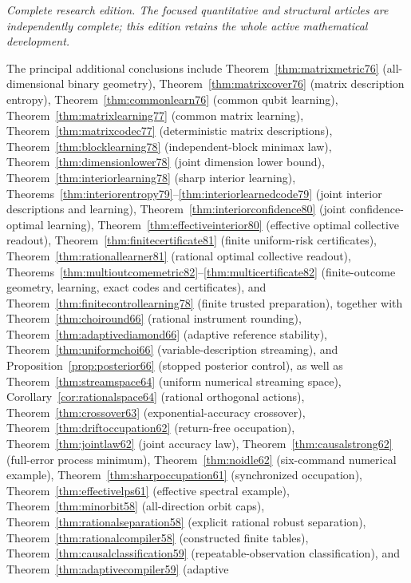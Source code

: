 \documentclass[11pt]{amsart}
\numberwithin{equation}{section}
\theoremstyle{definition}\newtheorem{definition}[theorem]{Definition}
\theoremstyle{remark}\newtheorem{remark}[theorem]{Remark}
\begin{document}
\noindent\textit{Complete research edition. The focused quantitative and structural articles are independently complete; this edition retains the whole active mathematical development.}

\noindent The principal additional conclusions include
Theorem~\ref{thm:matrixmetric76} (all-dimensional binary geometry),
Theorem~\ref{thm:matrixcover76} (matrix description entropy),
Theorem~\ref{thm:commonlearn76} (common qubit learning),
Theorem~\ref{thm:matrixlearning77} (common matrix learning),
Theorem~\ref{thm:matrixcodec77} (deterministic matrix descriptions),
Theorem~\ref{thm:blocklearning78} (independent-block minimax law),
Theorem~\ref{thm:dimensionlower78} (joint dimension lower bound),
Theorem~\ref{thm:interiorlearning78} (sharp interior learning),
Theorems~\ref{thm:interiorentropy79}--\ref{thm:interiorlearnedcode79}
(joint interior descriptions and learning),
Theorem~\ref{thm:interiorconfidence80} (joint confidence-optimal learning),
Theorem~\ref{thm:effectiveinterior80} (effective optimal collective readout),
Theorem~\ref{thm:finitecertificate81} (finite uniform-risk certificates),
Theorem~\ref{thm:rationallearner81} (rational optimal collective readout),
Theorems~\ref{thm:multioutcomemetric82}--\ref{thm:multicertificate82}
(finite-outcome geometry, learning, exact codes and certificates),
and Theorem~\ref{thm:finitecontrollearning78} (finite trusted preparation),
together with
Theorem~\ref{thm:choiround66} (rational instrument rounding),
Theorem~\ref{thm:adaptivediamond66} (adaptive reference stability),
Theorem~\ref{thm:uniformchoi66} (variable-description streaming),
and Proposition~\ref{prop:posterior66} (stopped posterior control),
as well as
Theorem~\ref{thm:streamspace64} (uniform numerical streaming space),
Corollary~\ref{cor:rationalspace64} (rational orthogonal actions),
Theorem~\ref{thm:crossover63} (exponential-accuracy crossover),
Theorem~\ref{thm:driftoccupation62} (return-free occupation),
Theorem~\ref{thm:jointlaw62} (joint accuracy law),
Theorem~\ref{thm:causalstrong62} (full-error process minimum),
Theorem~\ref{thm:noidle62} (six-command numerical example),
Theorem~\ref{thm:sharpoccupation61} (synchronized occupation),
Theorem~\ref{thm:effectivelps61} (effective spectral example),
Theorem~\ref{thm:minorbit58} (all-direction orbit caps),
Theorem~\ref{thm:rationalseparation58} (explicit rational robust separation),
Theorem~\ref{thm:rationalcompiler58} (constructed finite tables),
Theorem~\ref{thm:causalclassification59} (repeatable-observation
classification), and Theorem~\ref{thm:adaptivecompiler59} (adaptive
\end{document}
